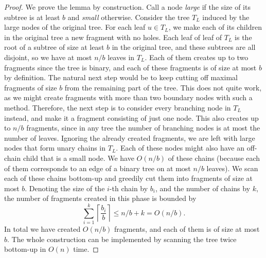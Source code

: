 \documentclass[a4paper,UKenglish]{lipics-v2016}
\theoremstyle{plain}
\begin{document}
\begin{proof}
We prove the lemma by construction. Call a node \textit{large} if the size of its subtree is at least $b$
and \textit{small} otherwise. Consider the tree $T_L$ induced by the large nodes of the original tree. 
For each leaf $u\in T_{L}$, we make each of its children in the original tree a new fragment with no holes.
Each leaf of leaf of $T_{L}$ is the root of a subtree of size at least $b$ in the original tree, and these subtrees
are all disjoint, so we have at most $n/b$ leaves in $T_{L}$. Each of them creates up to two fragments
since the tree is binary, and each of these fragments is of size at most $b$ by definition.
The natural next step would be to keep cutting off maximal fragments of size $b$ from the remaining
part of the tree. This does not quite work, as we might create fragments with more than two boundary
nodes with such a method.
Therefore, the next step is to consider every branching node in $T_{L}$ instead, and make it a fragment
consisting of just one node. This also creates up to $n/b$ fragments, since in any tree the number of
branching nodes is at most the number of leaves.
Ignoring the already created fragments, we are left with large nodes that form unary chains in $T_{L}$.
Each of these nodes might also have an off-chain child that is a small node. We have $O(n/b)$ of these chains
(because each of them corresponds to an edge of a binary tree on at most $n/b$ leaves).
We scan each of these chains bottom-up and greedily cut them into fragments of size at most $b$.
Denoting the size of the $i$-th chain by $b_{i}$, and the number of chains by $k$, the number of fragments created in this phase is
bounded by $$\sum_{i=1}^{k} \left\lceil \frac{b_i}{b} \right\rceil \leq n/b+k=O(n/b).$$
In total we have created $O(n/b)$ fragments, and each of them is of size at most $b$.
The whole construction can be implemented by scanning the tree twice bottom-up in $O(n)$ time.
\end{proof}
\end{document}
